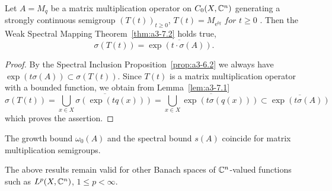 \begin{theorem}\label{thm:a3-7.2}
Let $A = M_{q}$ be a matrix multiplication operator on $C_{0}(X,\mathbb{C}^{n})$ generating a strongly continuous semigroup $(T(t))_{t\geq 0}$, $T(t) = M_{\mathrm{e}^{tq}} \textit{ for } t \geq 0$ .
Then the Weak Spectral Mapping Theorem~\ref{thm:a3-7.2} holds true, \ie 
\[
\sigma(T(t)) = \overline{\exp(t\cdot\sigma(A))} .
\]

\end{theorem}
\begin{proof}
By the Spectral Inclusion Proposition~\ref{prop:a3-6.2} we always have $\exp(t\sigma(A)) \subset \sigma(T(t))$.
Since $T(t)$ is a matrix multiplication operator with a bounded function, we obtain from Lemma~\ref{lem:a3-7.1}
\[
\sigma(T(t)) = \overline{\bigcup_{x\in X} \sigma(\exp(tq(x)))} = \overline{\bigcup_{x\in X} \exp(t\sigma(q(x)))} \subset \overline{\exp(t\sigma(A))}
\]
which proves the assertion.
\end{proof}
\begin{corollary}\label{cor:a3-7.3}
The growth bound $\omega_{0}(A)$ and the spectral bound $s(A)$ coincide for matrix multiplication semigroups.
\end{corollary}
The above results remain valid for other Banach spaces of $\mathbb{C}^{n}$-valued functions such as $L^{p}(X,\mathbb{C}^{n})$, $1 \leq p < \infty$.

